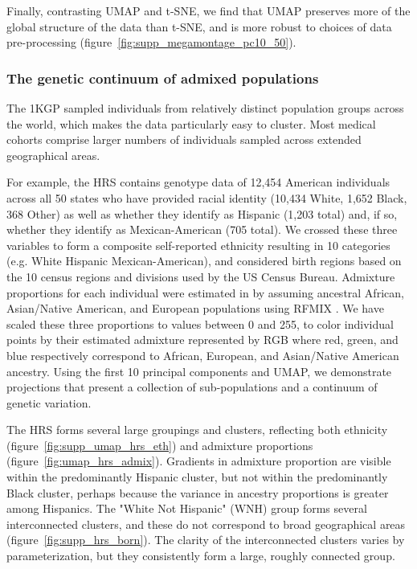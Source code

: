 \documentclass[12pt]{pnas-new}
\begin{document}
Finally, contrasting UMAP and t-SNE, we find that UMAP preserves more of the global structure of the data than t-SNE, and is more robust to choices of data pre-processing (figure~\ref{fig:supp_megamontage_pc10_50}).

\subsubsection*{The genetic continuum of admixed populations} The 1KGP sampled individuals from relatively distinct population groups across the world, which makes the data particularly easy to cluster. Most medical cohorts comprise larger numbers of individuals sampled across extended geographical areas. 

For example, the HRS contains genotype data of 12,454 American individuals across all 50 states who have provided racial identity (10,434 White, 1,652 Black, 368 Other) as well as whether they identify as Hispanic (1,203 total) and, if so, whether they identify as Mexican-American (705 total)\cite{juster1995overview}. We crossed these three variables to form a composite self-reported ethnicity resulting in 10 categories (e.g. White Hispanic Mexican-American), and considered birth regions based on the 10 census regions and divisions used by the US Census Bureau. Admixture proportions for each individual were estimated in \cite{baharian2016great} by assuming ancestral African, Asian/Native American, and European populations using RFMIX \cite{Maples:2013fia}.
We have scaled these three proportions to values between 0 and 255, to color individual points by their estimated admixture represented by RGB where red, green, and blue respectively correspond to African, European, and Asian/Native American ancestry. Using the first 10 principal components and UMAP, we demonstrate projections that present a collection of sub-populations and a continuum of genetic variation.

The HRS forms several large groupings and clusters, reflecting both ethnicity (figure~\ref{fig:supp_umap_hrs_eth}) and admixture proportions (figure~\ref{fig:umap_hrs_admix}). Gradients in admixture proportion are visible within the predominantly Hispanic cluster, but not within the predominantly Black cluster, perhaps because the variance in ancestry proportions is greater among Hispanics. The "White Not Hispanic" (WNH) group forms several interconnected clusters, and these do not correspond to broad geographical areas (figure~\ref{fig:supp_hrs_born}). The clarity of the interconnected clusters varies by parameterization, but they consistently form a large, roughly connected group.
\end{document}
